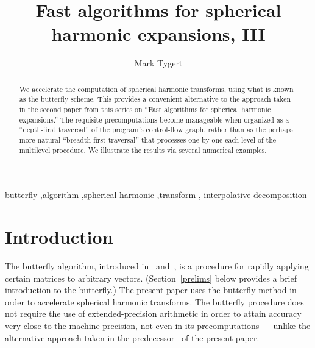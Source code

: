 \documentclass[final,3p,times]{elsarticle}
\begin{document}
\begin{frontmatter}





\title{Fast algorithms for spherical harmonic expansions, III}



\author{Mark Tygert}

\address{Courant Institute of Mathematical Sciences, NYU,
         251 Mercer St., New York, NY 10012}

\begin{abstract}
We accelerate the computation of spherical harmonic transforms,
using what is known as the butterfly scheme.
This provides a convenient alternative to the approach taken
in the second paper from this series
on ``Fast algorithms for spherical harmonic expansions.''
The requisite precomputations become manageable when organized
as a ``depth-first traversal'' of the program's control-flow graph,
rather than as the perhaps more natural ``breadth-first traversal''
that processes one-by-one each level of the multilevel procedure.
We illustrate the results via several numerical examples.
\end{abstract}

\begin{keyword}
butterfly \sep algorithm \sep spherical harmonic \sep transform \sep
interpolative decomposition



\end{keyword}

\end{frontmatter}







\section{Introduction}

The butterfly algorithm, introduced in~\cite{michielssen-boag}
and~\cite{oneil-woolfe-rokhlin}, is a procedure for rapidly applying
certain matrices to arbitrary vectors.
(Section~\ref{prelims} below provides a brief introduction to the butterfly.)
The present paper uses the butterfly method
in order to accelerate spherical harmonic transforms.
The butterfly procedure does not require the use of extended-precision
arithmetic in order to attain accuracy very close to the machine precision,
not even in its precomputations --- unlike the alternative approach taken
in the predecessor~\cite{tygert_sph} of the present paper.
\end{document}

